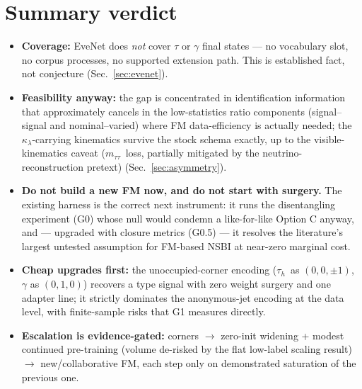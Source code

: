 \documentclass[11pt]{article}
\newcommand{\kl}{\ensuremath{\kappa_\lambda}}
\newcommand{\tauh}{\ensuremath{\tau_h}}
\newcommand{\mtt}{\ensuremath{m_{\tau\tau}}}
\begin{document}
\section{Summary verdict}
\label{sec:verdict}

\begin{itemize}
\item \textbf{Coverage:} EveNet does \emph{not} cover $\tau$ or $\gamma$
  final states --- no vocabulary slot, no corpus processes, no supported
  extension path. This is established fact, not conjecture
  (Sec.~\ref{sec:evenet}).
\item \textbf{Feasibility anyway:} the gap is concentrated in
  identification information that approximately cancels in the
  low-statistics ratio components (signal--signal and nominal--varied)
  where FM data-efficiency is actually needed; the \kl-carrying
  kinematics survive the stock schema exactly, up to the visible-kinematics
  caveat (\mtt\ loss, partially mitigated by the neutrino-reconstruction
  pretext) (Sec.~\ref{sec:asymmetry}).
\item \textbf{Do not build a new FM now, and do not start with surgery.}
  The existing harness is the correct next instrument: it runs the
  disentangling experiment (G0) whose null would condemn a like-for-like
  Option C anyway, and --- upgraded with closure metrics (G0.5) --- it
  resolves the literature's largest untested assumption for FM-based NSBI
  at near-zero marginal cost.
\item \textbf{Cheap upgrades first:} the unoccupied-corner encoding
  (\tauh\ as $(0,0,\pm1)$, $\gamma$ as $(0,1,0)$) recovers a type signal
  with zero weight surgery and one adapter line; it strictly dominates the
  anonymous-jet encoding at the data level, with finite-sample risks that
  G1 measures directly.
\item \textbf{Escalation is evidence-gated:} corners $\to$ zero-init
  widening + modest continued pre-training (volume de-risked by the flat
  low-label scaling result) $\to$ new/collaborative FM, each step only on
  demonstrated saturation of the previous one.
\end{itemize}
\end{document}

